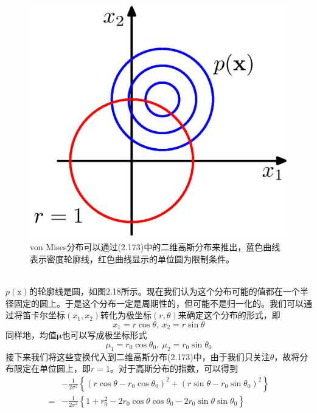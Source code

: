 \documentclass[b5paper]{book}
\numberwithin{equation}{chapter}
\newcommand {\bx} {\boldsymbol{\mathrm{x}}}
\newcommand {\bfMu} {\boldsymbol{\mu}}
\begin{document}
{	\begin{figure}[ht]
		\centering
		\includegraphics[scale=0.8]{Images/2-18.png}
		\caption{von Mises分布可以通过(2.173)中的二维高斯分布来推出，蓝色曲线表示密度轮廓线，红色曲线显示的单位圆为限制条件。}
		\label{fig:2-18}
	\end{figure}
	\\
	\indent $p(\bx)$的轮廓线是圆，如图2.18所示。现在我们认为这个分布可能的值都在一个半径固定的圆上。于是这个分布一定是周期性的，但可能不是归一化的。我们可以通过将笛卡尔坐标$(x_1,x_2)$转化为极坐标$(r,\theta)$来确定这个分布的形式，即
	\begin{equation}
		x_1=r\cos \theta, \ x_2=r \sin \theta
	\end{equation}
	同样地，均值$\bfMu$也可以写成极坐标形式
	\begin{equation}
		\mu_1 = r_0 \cos \theta_0, \ \mu_2=r_0 \sin \theta_0
	\end{equation}
	接下来我们将这些变换代入到二维高斯分布(2.173)中，由于我们只关注$\theta$，故将分布限定在单位圆上，即$r=1$。对于高斯分布的指数，可以得到
	\begin{equation}
	\begin{split}
		&-\frac{1}{2\sigma^2}\left\{(r\cos \theta-r_0 \cos \theta_0)^2 + (r\sin \theta-r_0 \sin \theta_0)^2\right\} \\
		= &-\frac{1}{2\sigma^2}\left\{1+r_0^2-2r_0\cos \theta \cos \theta_0 - 2 r_0 \sin \theta \sin \theta_0\right\} \\

\end{split}
\end{equation}}
\end{document}
